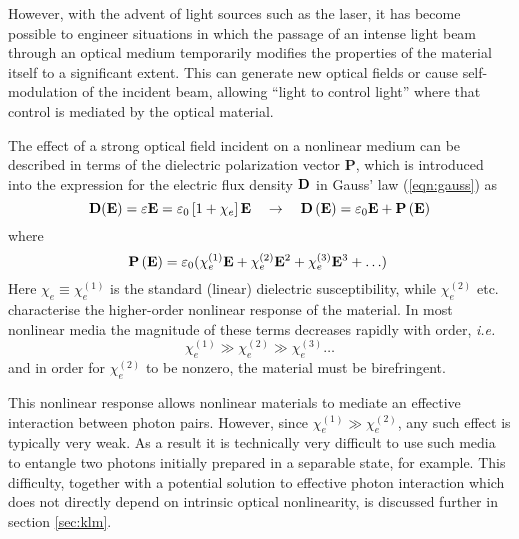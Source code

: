 However, with the advent of light sources such as the laser, it has become possible to engineer situations in which the passage of an intense light beam through an optical medium temporarily modifies the properties of the material itself to a significant extent. This can generate new optical fields or cause self-modulation of the incident beam, allowing ``light to control light'' where that control is mediated by the optical material. 

The effect of a strong optical field incident on a nonlinear medium can be described in terms of the dielectric polarization vector $\mathbf{P}$, which is introduced into the expression for the electric flux density $\mathbf{D}$ in Gauss' law (\ref{eqn:gauss}) as 
\begin{equation}
    \mathbf{D}(\mathbf{E}) = \varepsilon \mathbf{E}  = \varepsilon_0 \left[1+ \chi_e\right] \mathbf{E}
    \quad \rightarrow \quad 
    \mathbf{D} \left(\mathbf{E} \right) = \varepsilon_0\mathbf{E} + \mathbf{P}\left(\mathbf{E} \right)
\end{equation}
where
\begin{equation}
    \mathbf{P}\left(\mathbf{E}\right) = \varepsilon_0( \chi^{(1)}_e \mathbf{E} + \chi^{(2)}_e \mathbf{E}^2 + \chi^{(3)}_e \mathbf{E}^3 + \ldots )\
\label{eqn:chi_nonlinear}
\end{equation}
%
Here $\chi_e \equiv \chi_e^{(1)}$ is the standard (linear) dielectric susceptibility, while $\chi^{(2)}_e$ etc. characterise the higher-order nonlinear response of the material. In most nonlinear media the magnitude of these terms decreases rapidly with order, \emph{i.e.}
\begin{equation}
\chi_e^{(1)} \gg  \chi_e^{(2)} \gg \chi_e^{(3)} \ldots
\end{equation}
and in order for $\chi_e^{(2)}$ to be nonzero, the material must be birefringent.

This nonlinear response allows nonlinear materials to mediate an effective interaction between photon pairs. However, since $\chi_e^{(1)} \gg  \chi_e^{(2)}$, any such effect is typically very weak. As a result it is technically very difficult to use such media to entangle two photons initially prepared in a separable state, for example. This difficulty, together with a potential solution to effective photon interaction which does not directly depend on intrinsic optical nonlinearity, is discussed further in section \ref{sec:klm}.

